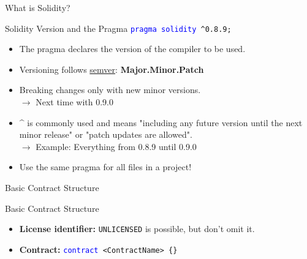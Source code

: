 \documentclass[]{beamer}
\begin{document}
\begin{frame}{What is Solidity?}
\vspace{1em}
	

\end{frame}


\begin{frame}{Solidity Version and the Pragma}
	\texttt{\textcolor{blue}{pragma solidity} \^{}0.8.9;}
\vspace{1em}
	\begin{itemize}
		\item The pragma declares the version of the compiler to be used.
 		\item Versioning follows \link \href{https://semver.org/}{semver}: \textbf{Major.Minor.Patch}
 		\item Breaking changes only with new minor versions. \\ {\small $\rightarrow$ Next time with 0.9.0}
		\item  \^{} is commonly used and means "including any future version until the next minor release" or "patch updates are allowed". \\
 {$\rightarrow$ \small Example: Everything from 0.8.9 until 0.9.0}
 		\item Use the same pragma for all files in a project!
	\end{itemize}
\end{frame}


\begin{frame}{Basic Contract Structure}
	\begin{samplecode}{Basic Contract Structure}
		
	\end{samplecode}
\begin{itemize}
\item \textbf{License identifier:} \texttt{UNLICENSED} is possible, but don't omit it.
\item \textbf{Contract:} \texttt{\textcolor{blue}{contract} <ContractName> \{\}}
\end{itemize}
\end{frame}
\end{document}
